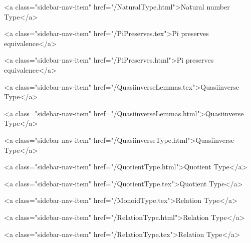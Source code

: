       
        
          <a class="sidebar-nav-item" href="/NaturalType.html">Natural number Type</a>
        
      
    
      
        
          <a class="sidebar-nav-item" href="/PiPreserves.tex">Pi preserves equivalence</a>
        
      
    
      
        
          <a class="sidebar-nav-item" href="/PiPreserves.html">Pi preserves equivalence</a>
        
      
    
      
        
          <a class="sidebar-nav-item" href="/QuasiinverseLemmas.tex">Quasiinverse Type</a>
        
      
    
      
        
          <a class="sidebar-nav-item" href="/QuasiinverseLemmas.html">Quasiinverse Type</a>
        
      
    
      
        
          <a class="sidebar-nav-item" href="/QuasiinverseType.html">Quasiinverse Type</a>
        
      
    
      
        
          <a class="sidebar-nav-item" href="/QuotientType.html">Quotient Type</a>
        
      
    
      
        
          <a class="sidebar-nav-item" href="/QuotientType.tex">Quotient Type</a>
        
      
    
      
        
          <a class="sidebar-nav-item" href="/MonoidType.tex">Relation Type</a>
        
      
    
      
        
          <a class="sidebar-nav-item" href="/RelationType.html">Relation Type</a>
        
      
    
      
        
          <a class="sidebar-nav-item" href="/RelationType.tex">Relation Type</a>
        
